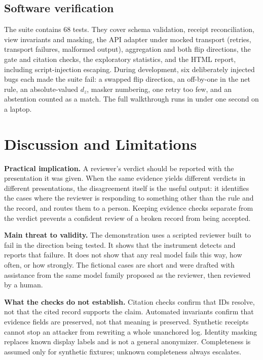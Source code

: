 \documentclass[11pt]{article}
\begin{document}
\subsection{Software verification}

The suite contains 68 tests. They cover schema validation, receipt reconciliation, view invariants and masking, the API adapter under mocked transport (retries, transport failures, malformed output), aggregation and both flip directions, the gate and citation checks, the exploratory statistics, and the HTML report, including script-injection escaping. During development, six deliberately injected bugs each made the suite fail: a swapped flip direction, an off-by-one in the net rule, an absolute-valued $d_z$, masker numbering, one retry too few, and an abstention counted as a match. The full walkthrough runs in under one second on a laptop.

\section{Discussion and Limitations}

\textbf{Practical implication.} A reviewer's verdict should be reported with the presentation it was given. When the same evidence yields different verdicts in different presentations, the disagreement itself is the useful output: it identifies the cases where the reviewer is responding to something other than the rule and the record, and routes them to a person. Keeping evidence checks separate from the verdict prevents a confident review of a broken record from being accepted.

\textbf{Main threat to validity.} The demonstration uses a scripted reviewer built to fail in the direction being tested. It shows that the instrument detects and reports that failure. It does not show that any real model fails this way, how often, or how strongly. The fictional cases are short and were drafted with assistance from the same model family proposed as the reviewer, then reviewed by a human.

\textbf{What the checks do not establish.} Citation checks confirm that IDs resolve, not that the cited record supports the claim. Automated invariants confirm that evidence fields are preserved, not that meaning is preserved. Synthetic receipts cannot stop an attacker from rewriting a whole unanchored log. Identity masking replaces known display labels and is not a general anonymizer. Completeness is assumed only for synthetic fixtures; unknown completeness always escalates.
\end{document}
